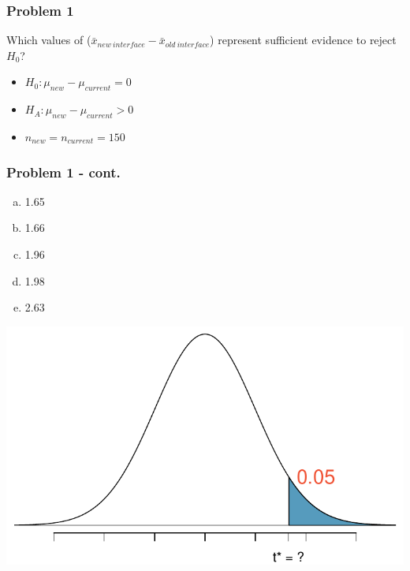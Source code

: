 \documentclass[slidestop,compress,mathserif,12pt,t,professionalfonts,xcolor=table]{beamer}
\newcommand{\solnMult}[1]{#1}
\begin{document}
\begin{frame}
\frametitle{Problem 1}

Which values of ($\bar{x}_{new~interface} - \bar{x}_{old~interface}$) represent sufficient 
evidence to reject $H_0$?

\begin{itemize}
\item[] $H_0: \mu_{new} - \mu_{current} = 0$
\item[] $H_A: \mu_{new} - \mu_{current} > 0$
\item[] $n_{new} = n_{current} = 150$
\end{itemize}

\end{frame}


\begin{frame}
\frametitle{Problem 1 - cont.}


{
\begin{enumerate}[(a)]
\item 1.65
\item \solnMult{1.66}
\item 1.96
\item 1.98
\item 2.63
\end{enumerate}
}
{
\includegraphics[width=\textwidth]{figures/med_hist_surveys/power_t_star_clicker.pdf}
}

\end{frame}
\end{document}
